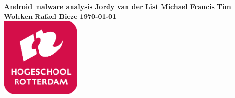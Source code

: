 \documentclass{article}
\begin{document}


\begin{titlepage}
  \centering
    \vfill
    {\bfseries\Huge
      Android malware analysis
        \vskip2cm
      }
      {\bfseries\Large
        Jordy van der List
        \vskip0cm
      }
      {\bfseries\Large
        Michael Francis
        \vskip0cm
      }
      {\bfseries\Large
        Tim Wolcken
        \vskip0cm
      }
      {\bfseries\Large
        Rafael Bieze
        \vskip0cm
      }
      {
        \bfseries\normalsize
        \vskip1cm
        \today\\
    }
    \vfill
    \includegraphics[width=4cm]{logohr.png} %
    \vfill
    \vfill
\end{titlepage}

\setlength{\parindent}{0em}
\setlength{\parskip}{1em}
\flushleft



\setlength{\parindent}{1em}
\setlength{\parskip}{0em}
\flushleft

\tableofcontents

\setlength{\parindent}{0em}
\setlength{\parskip}{1em}
\flushleft



\newpage


\newpage


\newpage


\newpage


\newpage


\newpage







\end{document}
